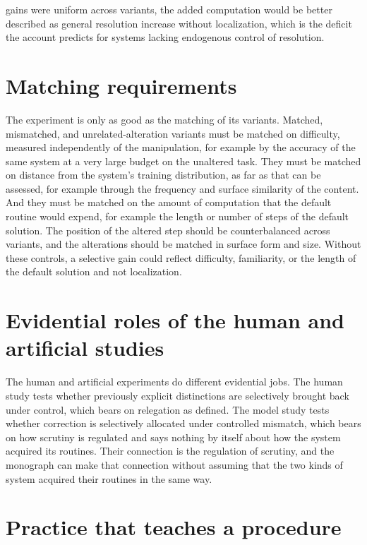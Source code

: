 \documentclass[11pt]{report}
\theoremstyle{remark}
\theoremstyle{definition}
\begin{document}
gains were uniform across variants, the added computation would be better described as general resolution increase without localization, which is the deficit the account predicts for systems lacking endogenous control of resolution.

\section{Matching requirements}

The experiment is only as good as the matching of its variants. Matched, mismatched, and unrelated-alteration variants must be matched on difficulty, measured independently of the manipulation, for example by the accuracy of the same system at a very large budget on the unaltered task. They must be matched on distance from the system's training distribution, as far as that can be assessed, for example through the frequency and surface similarity of the content. And they must be matched on the amount of computation that the default routine would expend, for example the length or number of steps of the default solution. The position of the altered step should be counterbalanced across variants, and the alterations should be matched in surface form and size. Without these controls, a selective gain could reflect difficulty, familiarity, or the length of the default solution and not localization.

\section{Evidential roles of the human and artificial studies}

The human and artificial experiments do different evidential jobs. The human study tests whether previously explicit distinctions are selectively brought back under control, which bears on relegation as defined. The model study tests whether correction is selectively allocated under controlled mismatch, which bears on how scrutiny is regulated and says nothing by itself about how the system acquired its routines. Their connection is the regulation of scrutiny, and the monograph can make that connection without assuming that the two kinds of system acquired their routines in the same way.

\section{Practice that teaches a procedure}
\end{document}
